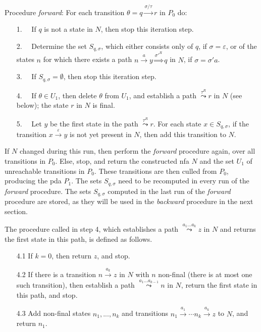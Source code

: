 \documentclass{llncs}
\newcommand{\eps}{\ensuremath{\varepsilon}}
\begin{document}
\noindent
Procedure {\em forward}: For each transition $\theta=q\stackrel{\sigma/\tau}{\rightarrow}r$ in $P_0$ do:
\begin{enumerate}
\item[1.~~]
If $q$ is not a state in $N$, then stop this iteration step.\vspace{1mm}
\item[2.~~]
Determine the set $S_{q,\sigma}$, which either consists only of $q$, if $\sigma=\eps$, or of the states $n$ for which
there exists a path $n\stackrel{a}{\rightarrow}y\stackrel{\sigma'^R}{\Longrightarrow}q$ in $N$, if $\sigma=\sigma'a$.\vspace{1mm}
\item[3.~~]
If $S_{q,\sigma}=\emptyset$, then stop this iteration step.
\item[4.~~]
If $\theta\in U_1$, then delete $\theta$ from $U_1$, and establish a path $\stackrel{\tau^R}{\leadsto}r$ in $N$ (see below); the state $r$ in $N$ is final.\vspace{1mm}
\item[5.~~]
Let $y$ be the first state in the path $\stackrel{\tau^R}{\leadsto}r$. For each state $x\in S_{q,\sigma}$, if the transition $x\stackrel{\eps}{\rightarrow}y$
is not yet present in $N$, then add this transition to $N$.
\end{enumerate}

\vspace{1mm}

\noindent
If $N$ changed during this run, then perform the {\em forward} procedure again, over all transitions in $P_0$.
Else, stop, and return the constructed nfa $N$ and the set $U_1$ of unreachable transitions in $P_0$.
These transitions are then culled from $P_0$, producing the pda $P_1$.
The sets $S_{q,\sigma}$ need to be recomputed in every run of the {\em forward} procedure.
The sets $S_{q,\sigma}$ computed in the last run of the {\em forward} procedure are stored,
as they will be used in the {\em backward} procedure in the next section.

The procedure called in step 4, which establishes a path $\stackrel{a_1...a_k}{\leadsto}z$ in $N$
and returns the first state in this path, is defined as follows.
\begin{itemize}
\item[4.1]
If $k=0$, then return $z$, and stop.\vspace{1mm}
\item[4.2]
If there is a transition $n\stackrel{a_k}{\rightarrow}z$ in $N$ with $n$ non-final (there is at most one such transition),
then establish a path $\stackrel{a_1...a_{k-1}}{\leadsto}n$ in $N$, return the first state in this path, and stop.\vspace{1mm}
\item[4.3]
Add non-final states $n_1,...,n_k$ and transitions $n_1\!\stackrel{a_1}{\rightarrow}\!\cdots n_k\!\stackrel{a_k}{\rightarrow}\!z$ to $N$,
and return $n_1$.
\end{itemize}
\end{document}
